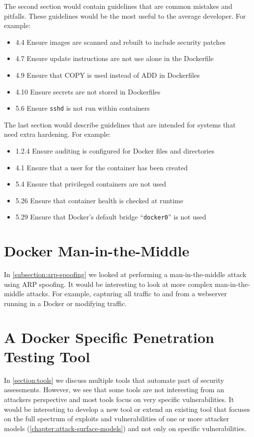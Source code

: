 \medskip

The second section would contain guidelines that are common mistakes and pitfalls. These guidelines would be the most useful to the average developer. For example:
\begin{itemize}
    \item 4.4 Ensure images are scanned and rebuilt to include security patches
    \item 4.7 Ensure update instructions are not use alone in the Dockerfile
    \item 4.9 Ensure that COPY is used instead of ADD in Dockerfiles
    \item 4.10 Ensure secrets are not stored in Dockerfiles
    \item 5.6 Ensure \lstinline{sshd} is not run within containers
\end{itemize}

\medskip

The last section would describe guidelines that are intended for systems that need extra hardening. For example:
\begin{itemize}
    \item 1.2.4 Ensure auditing is configured for Docker files and directories
    \item 4.1 Ensure that a user for the container has been created
    \item 5.4 Ensure that privileged containers are not used
    \item 5.26 Ensure that container health is checked at runtime
    \item 5.29 Ensure that Docker's default bridge ``\lstinline{docker0}'' is not used
\end{itemize}

\section{Docker Man-in-the-Middle}
In \autoref{subsection:arp-spoofing} we looked at performing a man-in-the-middle attack using ARP spoofing. It would be interesting to look at more complex man-in-the-middle attacks. For example, capturing all traffic to and from a webserver running in a Docker or modifying traffic.

\section{A Docker Specific Penetration Testing Tool}
In \autoref{section:tools} we discuss multiple tools that automate part of security assessments. However, we see that some tools are not interesting from an attackers perspective and most tools focus on very specific vulnerabilities. It would be interesting to develop a new tool or extend an existing tool that focuses on the full spectrum of exploits and vulnerabilities of one or more attacker models (\autoref{chapter:attack-surface-models}) and not only on specific vulnerabilities.
